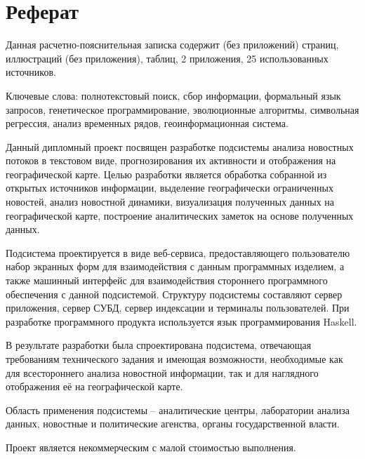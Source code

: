 \section*{Реферат}
\thispagestyle{empty}
Данная расчетно-пояснительная записка содержит \pageref{preLastPage} (без приложений) страниц,  иллюстраций (без приложения),  таблиц, 2 приложения, 25 использованных источников.

Ключевые слова: полнотекстовый поиск, сбор информации, формальный язык запросов, генетическое программирование, эволюционные алгоритмы, символьная регрессия, анализ временных рядов, геоинформационная система.

Данный дипломный проект посвящен разработке подсистемы анализа новостных потоков в текстовом виде, прогнозирования их активности и отображения на географической карте. Целью разработки является обработка собранной из открытых источников информации, выделение географически ограниченных новостей, анализ новостной динамики, визуализация полученных данных на географической карте, построение аналитических заметок на основе полученных данных.

Подсистема проектируется в виде веб-сервиса, предоставляющего пользователю набор экранных форм для взаимодействия с данным программных изделием, а также машинный интерфейс для взаимодействия стороннего программного обеспечения с данной подсистемой. Структуру подсистемы составляют сервер приложения, сервер СУБД, сервер индексации и терминалы пользователей. При разработке программного продукта используется язык программирования Haskell.

В результате разработки была спроектирована подсистема, отвечающая требованиям технического задания и имеющая возможности, необходимые как для всестороннего анализа новостной информации, так и для наглядного отображения её на географической карте. 

Область применения подсистемы -- аналитические центры, лаборатории анализа данных, новостные и политические агенства, органы государственной власти.

Проект является некоммерческим с малой стоимостью выполнения.